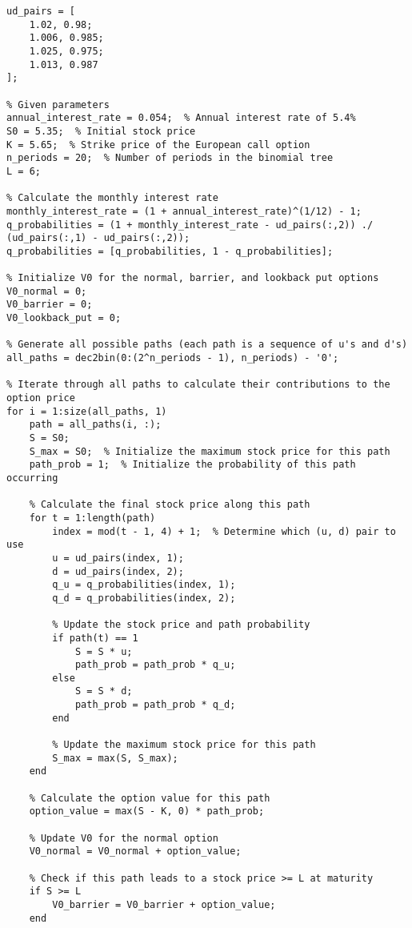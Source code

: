 \documentclass[12pt]{article}
\begin{document}
\begin{lstlisting}[label=lst:code,
    caption=Complete MATLAB Code]
% Define ud_pairs array
ud_pairs = [
    1.02, 0.98;
    1.006, 0.985;
    1.025, 0.975;
    1.013, 0.987
];

% Given parameters
annual_interest_rate = 0.054;  % Annual interest rate of 5.4%
S0 = 5.35;  % Initial stock price
K = 5.65;  % Strike price of the European call option
n_periods = 20;  % Number of periods in the binomial tree
L = 6;

% Calculate the monthly interest rate
monthly_interest_rate = (1 + annual_interest_rate)^(1/12) - 1;
q_probabilities = (1 + monthly_interest_rate - ud_pairs(:,2)) ./ (ud_pairs(:,1) - ud_pairs(:,2));
q_probabilities = [q_probabilities, 1 - q_probabilities];

% Initialize V0 for the normal, barrier, and lookback put options
V0_normal = 0;
V0_barrier = 0;
V0_lookback_put = 0;

% Generate all possible paths (each path is a sequence of u's and d's)
all_paths = dec2bin(0:(2^n_periods - 1), n_periods) - '0';

% Iterate through all paths to calculate their contributions to the option price
for i = 1:size(all_paths, 1)
    path = all_paths(i, :);
    S = S0;
    S_max = S0;  % Initialize the maximum stock price for this path
    path_prob = 1;  % Initialize the probability of this path occurring
    
    % Calculate the final stock price along this path
    for t = 1:length(path)
        index = mod(t - 1, 4) + 1;  % Determine which (u, d) pair to use
        u = ud_pairs(index, 1);
        d = ud_pairs(index, 2);
        q_u = q_probabilities(index, 1);
        q_d = q_probabilities(index, 2);
        
        % Update the stock price and path probability
        if path(t) == 1
            S = S * u;
            path_prob = path_prob * q_u;
        else
            S = S * d;
            path_prob = path_prob * q_d;
        end

        % Update the maximum stock price for this path
        S_max = max(S, S_max);
    end
    
    % Calculate the option value for this path
    option_value = max(S - K, 0) * path_prob;
    
    % Update V0 for the normal option
    V0_normal = V0_normal + option_value;
    
    % Check if this path leads to a stock price >= L at maturity
    if S >= L
        V0_barrier = V0_barrier + option_value;
    end


\end{lstlisting}
\end{document}
